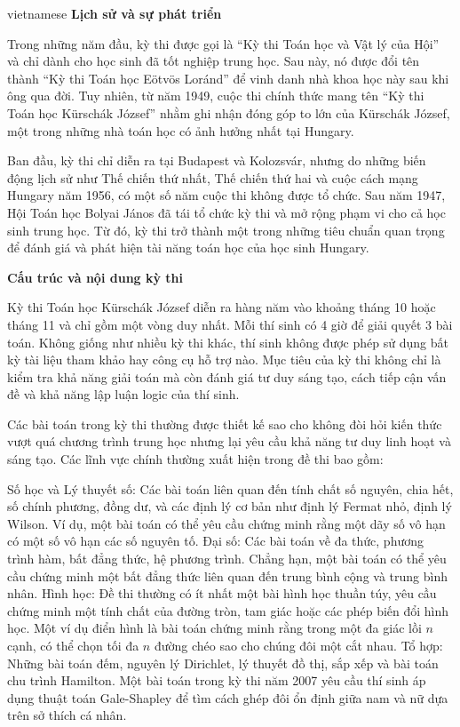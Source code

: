 \documentclass{article}
\begin{document}
\begin{otherlanguage*}{vietnamese}
\textbf{Lịch sử và sự phát triển}

Trong những năm đầu, kỳ thi được gọi là “Kỳ thi Toán học và Vật lý của Hội” và chỉ dành cho học sinh đã tốt nghiệp trung học.
Sau này, nó được đổi tên thành “Kỳ thi Toán học Eötvös Loránd” để vinh danh nhà khoa học này sau khi ông qua đời.
Tuy nhiên, từ năm 1949, cuộc thi chính thức mang tên “Kỳ thi Toán học Kürschák József” nhằm ghi nhận đóng góp to lớn của Kürschák József,
một trong những nhà toán học có ảnh hưởng nhất tại Hungary.

Ban đầu, kỳ thi chỉ diễn ra tại Budapest và Kolozsvár, nhưng do những biến động lịch sử như Thế chiến thứ nhất,
Thế chiến thứ hai và cuộc cách mạng Hungary năm 1956, có một số năm cuộc thi không được tổ chức.
Sau năm 1947, Hội Toán học Bolyai János đã tái tổ chức kỳ thi và mở rộng phạm vi cho cả học sinh trung học.
Từ đó, kỳ thi trở thành một trong những tiêu chuẩn quan trọng để đánh giá và phát hiện tài năng toán học của học sinh Hungary.

\textbf{Cấu trúc và nội dung kỳ thi}

Kỳ thi Toán học Kürschák József diễn ra hàng năm vào khoảng tháng 10 hoặc tháng 11 và chỉ gồm một vòng duy nhất. Mỗi thí sinh có 4 giờ để giải quyết 3 bài toán.
Không giống như nhiều kỳ thi khác, thí sinh không được phép sử dụng bất kỳ tài liệu tham khảo hay công cụ hỗ trợ nào.
Mục tiêu của kỳ thi không chỉ là kiểm tra khả năng giải toán mà còn đánh giá tư duy sáng tạo, cách tiếp cận vấn đề và khả năng lập luận logic của thí sinh.

Các bài toán trong kỳ thi thường được thiết kế sao cho không đòi hỏi kiến thức vượt quá chương trình trung học nhưng lại yêu cầu khả năng tư duy linh hoạt và sáng tạo.
Các lĩnh vực chính thường xuất hiện trong đề thi bao gồm:
\begin{itemize}[topsep=0pt, partopsep=0pt, itemsep=0pt]
    \ii Số học và Lý thuyết số: Các bài toán liên quan đến tính chất số nguyên, chia hết, số chính phương, đồng dư, và các định lý cơ bản như định lý Fermat nhỏ, định lý Wilson.
    Ví dụ, một bài toán có thể yêu cầu chứng minh rằng một dãy số vô hạn có một số vô hạn các số nguyên tố.
    \ii Đại số: Các bài toán về đa thức, phương trình hàm, bất đẳng thức, hệ phương trình.
    Chẳng hạn, một bài toán có thể yêu cầu chứng minh một bất đẳng thức liên quan đến trung bình cộng và trung bình nhân.
    \ii Hình học: Đề thi thường có ít nhất một bài hình học thuần túy, yêu cầu chứng minh một tính chất của đường tròn, tam giác hoặc các phép biến đổi hình học.
    Một ví dụ điển hình là bài toán chứng minh rằng trong một đa giác lồi $n$ cạnh, có thể chọn tối đa $n$ đường chéo sao cho chúng đôi một cắt nhau.
    \ii Tổ hợp: Những bài toán đếm, nguyên lý Dirichlet, lý thuyết đồ thị, sắp xếp và bài toán chu trình Hamilton.
    Một bài toán trong kỳ thi năm 2007 yêu cầu thí sinh áp dụng thuật toán Gale-Shapley để tìm cách ghép đôi ổn định giữa nam và nữ dựa trên sở thích cá nhân.
\end{itemize}


\end{otherlanguage*}
\end{document}
